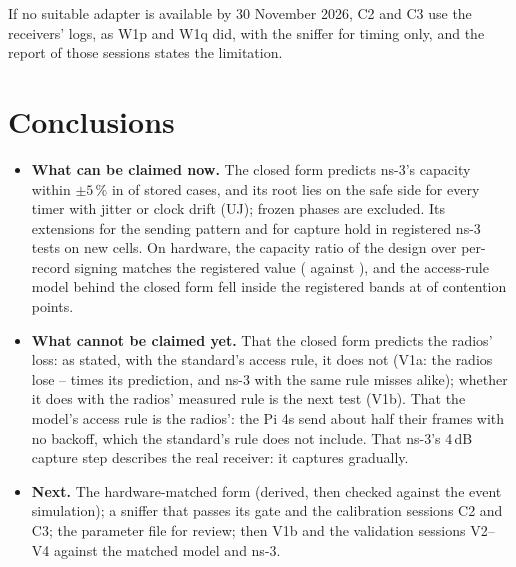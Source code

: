 \documentclass[11pt,a4paper]{article}
\newif\iffull
\begin{document}
If no suitable adapter is available by 30 November 2026, C2 and C3 use the receivers' logs, as W1p
and W1q did, with the sniffer for timing only, and the report of those sessions states the
limitation.

\section{Conclusions}

\begin{itemize}
\item \textbf{What can be claimed now.} The closed form predicts ns-3's capacity within $\pm5\,\%$ in
\scRootIn{} of \scRows{} stored cases, and its root lies on the safe side for every timer with jitter
or clock drift (UJ); frozen phases are excluded. Its extensions
for the sending pattern and for capture hold in registered ns-3 tests on new cells. On hardware, the
capacity ratio of the design over per-record signing matches the registered value (\ratioJ{}
against \ratioModel), and the access-rule model behind the closed form fell inside the registered
bands at \weHeld{} of \wePoints{} contention points.
\item \textbf{What cannot be claimed yet.} That the closed form predicts the radios' loss: as stated,
with the standard's access rule, it does not (V1a: the radios lose \vaFacMin--\vaFacMax{} times its
prediction, and ns-3 with the same rule misses alike); whether it does with the radios' measured
rule is the next test (V1b). That the model's access rule is the radios': the Pi 4s send about
half their frames with no backoff, which the standard's rule does not include. That ns-3's 4\,dB
capture step describes the real receiver: it captures gradually.
\item \textbf{Next.} The hardware-matched form (derived, then checked against the event simulation);
a sniffer that passes its gate and the calibration sessions C2 and C3; the parameter file for
review; then V1b and the validation sessions V2--V4 against the matched model and ns-3.
\end{itemize}

\iffull
\appendix
\end{document}
